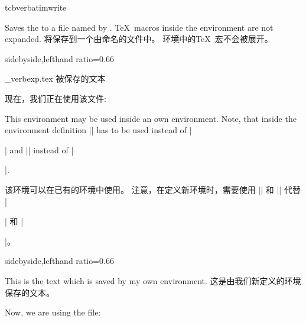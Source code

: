 \begin{docEnvironment}{tcbverbatimwrite}{}
\begin{stripedbox}
Saves the  to a file named by .
\TeX\ macros inside the environment are not expanded.
\tcblower
将保存到一个由命名的文件中。%
环境中的\TeX\ 宏不会被展开。
\end{stripedbox}

\begin{dispExample*}{sidebyside,lefthand ratio=0.66}
\begin{tcbverbatimwrite}{\jobname_verbexp.tex}
被保存的文本
\end{tcbverbatimwrite}

现在，我们正在使用该文件:\par

\end{dispExample*}

This environment may be used inside an own environment. Note, that inside
the environment definition |\tcbverbatimwrite| has to be used instead of
|\begin{tcbverbatimwrite}| and |\endtcbverbatimwrite| instead of |\end{tcbverbatimwrite}|.

该环境可以在已有的环境中使用。%
注意，在定义新环境时，需要使用 |\tcbverbatimwrite| 和 |\endtcbverbatimwrite| 代替 |\begin{tcbverbatimwrite}| 和 |\end{tcbverbatimwrite}|。

\begin{dispExample*}{sidebyside,lefthand ratio=0.66}
\newenvironment{myverbatim}{%
\begingroup{}}%
{\endtcbverbatimwrite\endgroup}

\begin{myverbatim}
This is the text which is saved by my own environment.
这是由我们新定义的环境保存的文本。
\end{myverbatim}

Now, we are using the file:\par

\end{dispExample*}
\end{docEnvironment}

